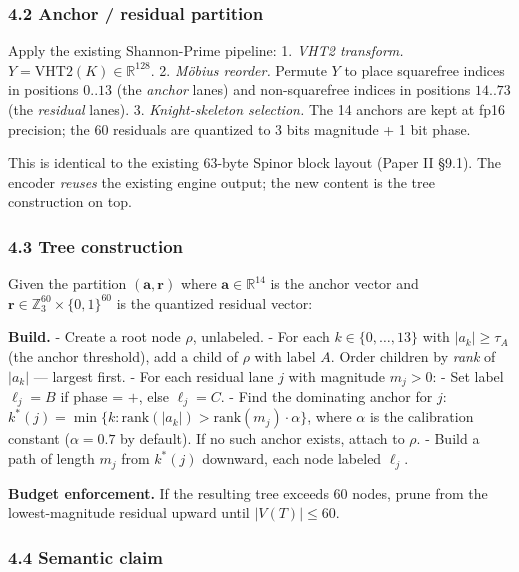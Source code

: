 \documentclass[
  11pt,
]{article}
\begin{document}
\hypertarget{anchor-residual-partition}{%
\subsubsection{4.2 Anchor / residual
partition}\label{anchor-residual-partition}}

Apply the existing Shannon-Prime pipeline: 1. \emph{VHT2 transform.}
\(Y = \mathrm{VHT2}(K) \in \mathbb{R}^{128}\). 2. \emph{Möbius reorder.}
Permute \(Y\) to place squarefree indices in positions \(0..13\) (the
\emph{anchor} lanes) and non-squarefree indices in positions \(14..73\)
(the \emph{residual} lanes). 3. \emph{Knight-skeleton selection.} The 14
anchors are kept at fp16 precision; the 60 residuals are quantized to 3
bits magnitude + 1 bit phase.

This is identical to the existing 63-byte Spinor block layout (Paper II
§9.1). The encoder \emph{reuses} the existing engine output; the new
content is the tree construction on top.

\hypertarget{tree-construction}{%
\subsubsection{4.3 Tree construction}\label{tree-construction}}

Given the partition \((\mathbf{a}, \mathbf{r})\) where
\(\mathbf{a} \in \mathbb{R}^{14}\) is the anchor vector and
\(\mathbf{r} \in \mathbb{Z}_3^{60} \times \{0,1\}^{60}\) is the
quantized residual vector:

\textbf{Build.} - Create a root node \(\rho\), unlabeled. - For each
\(k \in \{0,\dots,13\}\) with \(|a_k| \ge \tau_A\) (the anchor
threshold), add a child of \(\rho\) with label \(A\). Order children by
\emph{rank} of \(|a_k|\) --- largest first. - For each residual lane
\(j\) with magnitude \(m_j > 0\): - Set label \(\ell_j = B\) if phase =
\(+\), else \(\ell_j = C\). - Find the dominating anchor for \(j\):
\(k^*(j) = \min\{k : \mathrm{rank}(|a_k|) > \mathrm{rank}(m_j) \cdot \alpha\}\),
where \(\alpha\) is the calibration constant (\(\alpha = 0.7\) by
default). If no such anchor exists, attach to \(\rho\). - Build a path
of length \(m_j\) from \(k^*(j)\) downward, each node labeled
\(\ell_j\).

\textbf{Budget enforcement.} If the resulting tree exceeds 60 nodes,
prune from the lowest-magnitude residual upward until \(|V(T)| \le 60\).

\hypertarget{semantic-claim}{%
\subsubsection{4.4 Semantic claim}\label{semantic-claim}}
\end{document}
